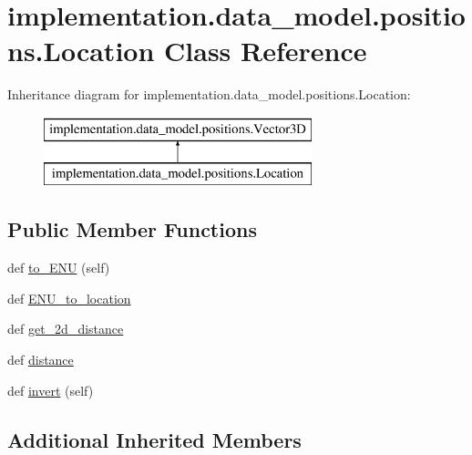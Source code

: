 \hypertarget{classimplementation_1_1data__model_1_1positions_1_1_location}{}\section{implementation.\+data\+\_\+model.\+positions.\+Location Class Reference}
\label{classimplementation_1_1data__model_1_1positions_1_1_location}
Inheritance diagram for implementation.\+data\+\_\+model.\+positions.\+Location\+:\begin{figure}[H]
\begin{center}
\leavevmode
\includegraphics[height=2.000000cm]{classimplementation_1_1data__model_1_1positions_1_1_location}
\end{center}
\end{figure}
\subsection*{Public Member Functions}
\begin{DoxyCompactItemize}
\item 
def \hyperlink{classimplementation_1_1data__model_1_1positions_1_1_location_aadfa22fb1aece1c971622d353ead8f52}{to\+\_\+\+E\+NU} (self)
\item 
def \hyperlink{classimplementation_1_1data__model_1_1positions_1_1_location_a527219476defb5b0d133753d6dd9e38b}{E\+N\+U\+\_\+to\+\_\+location}
\item 
def \hyperlink{classimplementation_1_1data__model_1_1positions_1_1_location_ae478f2b341a8cdd685749d8361b12223}{get\+\_\+2d\+\_\+distance}
\item 
def \hyperlink{classimplementation_1_1data__model_1_1positions_1_1_location_a3be0c075e6034c53b3319441efd28531}{distance}
\item 
def \hyperlink{classimplementation_1_1data__model_1_1positions_1_1_location_a5fc17326206c227594522dcaefed081c}{invert} (self)
\end{DoxyCompactItemize}
\subsection*{Additional Inherited Members}


